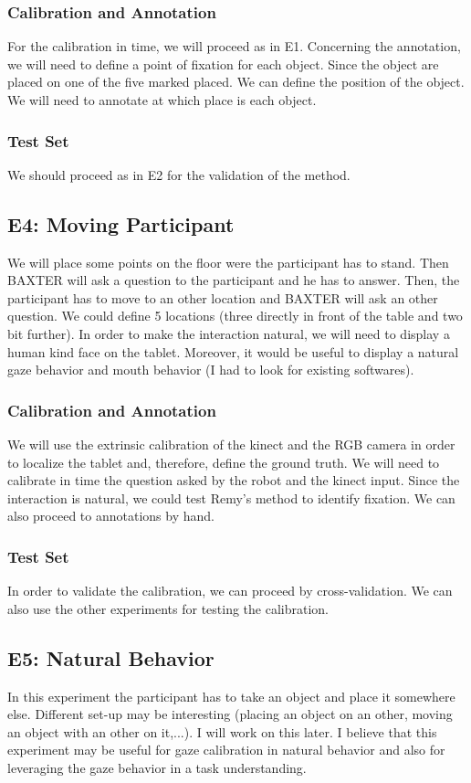 \documentclass[11pt,a4paper]{article}
\begin{document}
\subsubsection{Calibration and Annotation}
For the calibration in time, we will proceed as in E1. Concerning the annotation, we will need to define a point of fixation for each object. Since the object are placed on one of the five marked placed. We can define the position of the object. We will need to annotate at which place is each object.

\subsubsection{Test Set}
We should proceed as in E2 for the validation of the method.

\subsection{E4: Moving Participant}
We will place some points on the floor were the participant has to stand. Then BAXTER will ask a question to the participant and he has to answer. Then, the participant has to move to an other location and BAXTER will ask an other question. We could define 5 locations (three directly in front of the table and two bit further). In order to make the interaction natural, we will need to display a human kind face on the tablet. Moreover, it would be useful to display a natural gaze behavior and mouth behavior (I had to look for existing softwares).

\subsubsection{Calibration and Annotation}
We will use the extrinsic calibration of the kinect and the RGB camera in order to localize the tablet and, therefore, define the ground truth. We will need to calibrate in time the question asked by the robot and the kinect input. Since the interaction is natural, we could test Remy's method to identify fixation. We can also proceed to annotations by hand.

\subsubsection{Test Set}
In order to validate the calibration, we can proceed by cross-validation. We can also use the other experiments for testing the calibration.

\subsection{E5: Natural Behavior}
In this experiment the participant has to take an object and place it somewhere else. Different set-up may be interesting (placing an object on an other, moving an object with an other on it,...). I will work on this later. I believe that this experiment may be useful for gaze calibration in natural behavior and also for leveraging the gaze behavior in a task understanding.
\end{document}
